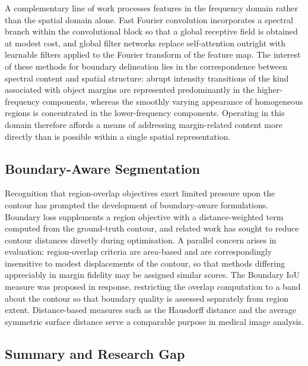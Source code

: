 A complementary line of work processes features in the frequency domain rather than the spatial domain alone. Fast Fourier convolution \cite{ref13} incorporates a spectral branch within the convolutional block so that a global receptive field is obtained at modest cost, and global filter networks \cite{ref14} replace self-attention outright with learnable filters applied to the Fourier transform of the feature map. The interest of these methods for boundary delineation lies in the correspondence between spectral content and spatial structure: abrupt intensity transitions of the kind associated with object margins are represented predominantly in the higher-frequency components, whereas the smoothly varying appearance of homogeneous regions is concentrated in the lower-frequency components. Operating in this domain therefore affords a means of addressing margin-related content more directly than is possible within a single spatial representation.

\subsection{Boundary-Aware Segmentation}

Recognition that region-overlap objectives exert limited pressure upon the contour has prompted the development of boundary-aware formulations. Boundary loss \cite{ref19} supplements a region objective with a distance-weighted term computed from the ground-truth contour, and related work has sought to reduce contour distances directly during optimisation. A parallel concern arises in evaluation: region-overlap criteria are area-based and are correspondingly insensitive to modest displacements of the contour, so that methods differing appreciably in margin fidelity may be assigned similar scores. The Boundary IoU measure \cite{ref12} was proposed in response, restricting the overlap computation to a band about the contour so that boundary quality is assessed separately from region extent. Distance-based measures such as the Hausdorff distance and the average symmetric surface distance serve a comparable purpose in medical image analysis.

\subsection{Summary and Research Gap}


